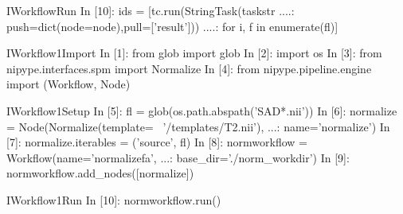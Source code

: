 \documentclass[portrait,final]{baposter}
\begin{document}
\begin{poster}
\begin{SaveVerbatim}{IWorkflowRun}
In [10]: ids = [tc.run(StringTask(taskstr%
   ....:        push=dict(node=node),pull=['result']))
   ....:        for i, f in enumerate(fl)]
\end{SaveVerbatim}


\begin{SaveVerbatim}{IWorkflow1Import}
In [1]: from glob import glob
In [2]: import os
In [3]: from nipype.interfaces.spm import Normalize
In [4]: from nipype.pipeline.engine import (Workflow, 
                                            Node)
\end{SaveVerbatim}

\begin{SaveVerbatim}{IWorkflow1Setup}
In [5]: fl = glob(os.path.abspath('SAD*.nii'))
In [6]: normalize = Node(Normalize(template= \
                                '/templates/T2.nii'),
   ...:                  name='normalize')
In [7]: normalize.iterables = ('source', fl)
In [8]: normworkflow = Workflow(name='normalizefa',
   ...:                    base_dir='./norm_workdir')
In [9]: normworkflow.add_nodes([normalize])
\end{SaveVerbatim}

\begin{SaveVerbatim}{IWorkflow1Run}
In [10]: normworkflow.run()
\end{SaveVerbatim}



\end{poster}
\end{document}
